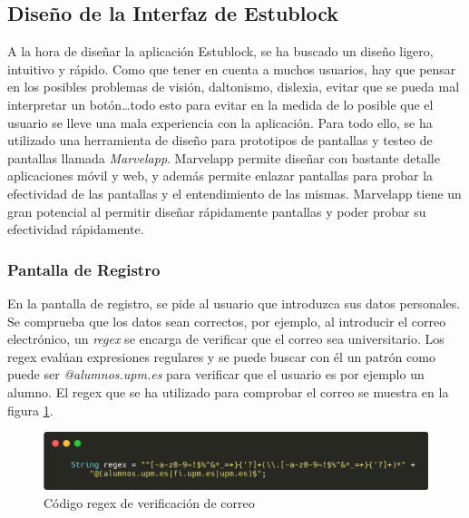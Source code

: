 \subsection{Diseño de la Interfaz de Estublock}

A la hora de diseñar la aplicación Estublock, se ha buscado un diseño ligero, intuitivo y rápido. Como que tener en cuenta a muchos usuarios, hay que pensar en los posibles problemas de visión, daltonismo, dislexia, evitar que se pueda mal interpretar un botón\dots todo esto para evitar en la medida de lo posible que el usuario se lleve una mala experiencia con la aplicación. Para todo ello, se ha utilizado una herramienta de diseño para prototipos de pantallas y testeo de pantallas llamada \emph{Marvelapp}\cite{marvelapp}. Marvelapp permite diseñar con bastante detalle aplicaciones móvil y web, y además permite enlazar pantallas para probar la efectividad de las pantallas y el entendimiento de las mismas. Marvelapp tiene un gran potencial al permitir diseñar rápidamente pantallas y poder probar su efectividad rápidamente. \\

\subsubsection{Pantalla de Registro}

En la pantalla de registro, se pide al usuario que introduzca sus datos personales. Se comprueba que los datos sean correctos, por ejemplo, al introducir el correo electrónico, un \textit{regex} se encarga de verificar que el correo sea universitario. Los regex evalúan expresiones regulares y se puede buscar con él un patrón como puede ser \textit{@alumnos.upm.es} para verificar que el usuario es por ejemplo un alumno. El regex que se ha utilizado para comprobar el correo se muestra en la figura \ref{fig:regex}. \\

\begin{figure}[h!]
  \centering
  \includegraphics[width=0.9\linewidth]{figs/Desarrollo/Codigo/regex}
  \caption[Código regex de verificación de correo]{Código regex de verificación de correo}
  \label{fig:regex}
\end{figure}

